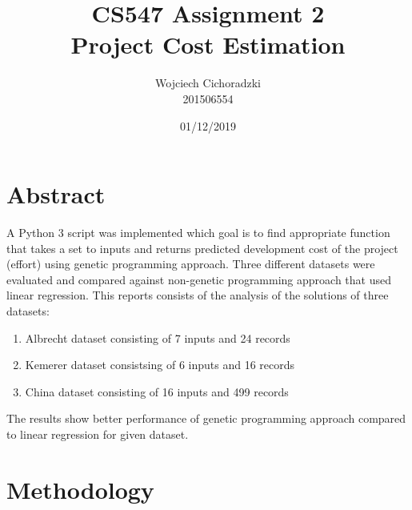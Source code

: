 \documentclass[12pt]{article}
\title{CS547 Assignment 2\\Project Cost Estimation}
\author{Wojciech Cichoradzki\\201506554}
\date{01/12/2019}
\begin{document}
\maketitle

\section{Abstract}
A Python 3 script was implemented which goal is to find appropriate function that takes a set to inputs and returns predicted development cost of the project (effort) using genetic programming approach. Three different datasets were evaluated and compared against non-genetic programming approach that used linear regression. This reports consists of the analysis of the solutions of three datasets:
\begin{enumerate}
  \item Albrecht dataset consisting of 7 inputs and 24 records
  \item Kemerer dataset consistsing of 6 inputs and 16 records
  \item China dataset consisting of 16 inputs and 499 records
\end{enumerate}
The results show better performance of genetic programming approach compared to linear regression for given dataset.

\section{Methodology}
\end{document}
